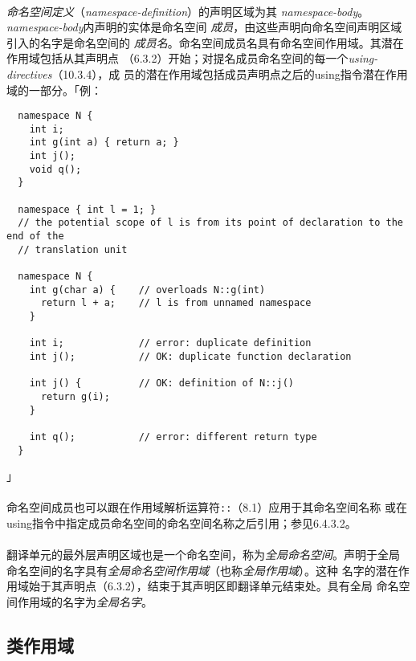 \paragraph{}
\textit{命名空间定义}（\textit{namespace-definition}）的声明区域为其
\textit{namespace-body}。\textit{namespace-body}内声明的实体是命名空间
\textit{成员}，由这些声明向命名空间声明区域引入的名字是命名空间的
\textit{成员名}。命名空间成员名具有命名空间作用域。其潜在作用域包括从其声明点
（6.3.2）开始；对提名成员命名空间的每一个\textit{using-directives}（10.3.4），成
员的潜在作用域包括成员声明点之后的using指令潜在作用域的一部分。「例：
\begin{lstlisting}
  namespace N {
    int i;
    int g(int a) { return a; }
    int j();
    void q();
  }

  namespace { int l = 1; }
  // the potential scope of l is from its point of declaration to the end of the
  // translation unit

  namespace N {
    int g(char a) {    // overloads N::g(int)
      return l + a;    // l is from unnamed namespace
    }

    int i;             // error: duplicate definition
    int j();           // OK: duplicate function declaration

    int j() {          // OK: definition of N::j()
      return g(i);
    }

    int q();           // error: different return type
  }
\end{lstlisting}」

\paragraph{}
命名空间成员也可以跟在作用域解析运算符\texttt{::}（8.1）应用于其命名空间名称
或在using指令中指定成员命名空间的命名空间名称之后引用；参见6.4.3.2。

\paragraph{}
翻译单元的最外层声明区域也是一个命名空间，称为\textit{全局命名空间}。声明于全局
命名空间的名字具有\textit{全局命名空间作用域}（也称\textit{全局作用域}）。这种
名字的潜在作用域始于其声明点（6.3.2），结束于其声明区即翻译单元结束处。具有全局
命名空间作用域的名字为\textit{全局名字}。

\subsection{类作用域}
